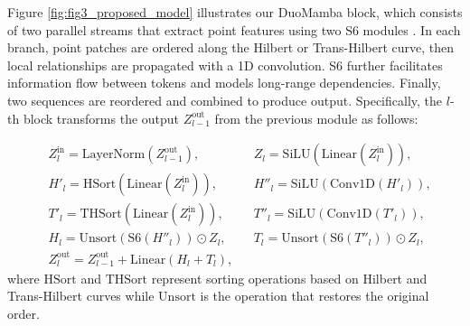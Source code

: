 Figure \ref{fig:fig3_proposed_model} illustrates our DuoMamba block, which consists of two parallel streams that extract point features using two S6 modules \cite{mamba}. In each branch, point patches are ordered along the Hilbert or Trans-Hilbert curve, then local relationships are propagated with a 1D convolution. S6 further facilitates information flow between tokens and models long-range dependencies. Finally, two sequences are reordered and combined to produce output. Specifically, the $l$-th block transforms the output $Z_{l-1}^{\text{out}}$ from the previous module as follows:

\vspace{-3mm}
{\footnotesize
\begin{equation}
\begin{aligned}
    & Z_l^{\text{in}} = \mathrm{LayerNorm} \left( Z_{l-1}^{\text{out}} \right), 
    & &Z_l = \mathrm{SiLU} \left( \mathrm{Linear} \left( Z_l^{\text{in}} \right) \right),\\
    & H'_l = \mathrm{HSort} \left( \mathrm{Linear} \left( Z_l^{\text{in}} \right) \right),     
    & &H''_l = \mathrm{SiLU} \left( \mathrm{Conv1D} \left( H'_l \right) \right),\\
    & T'_l = \mathrm{THSort} \left( \mathrm{Linear} \left( Z_l^{\text{in}} \right) \right),
    & &T''_l = \mathrm{SiLU} \left( \mathrm{Conv1D} \left( T'_l \right) \right),\\
    & H_l = \mathrm{Unsort} \left( \mathrm{S6} \left( H''_l \right) \right) \odot Z_l, 
    & &T_l = \mathrm{Unsort} \left( \mathrm{S6} \left( T''_l \right) \right) \odot Z_l,\\
    & Z_l^{\text{out}} = Z_{l-1}^{\text{out}} + \mathrm{Linear} \left( H_l + T_l \right),
\end{aligned}    
\end{equation}
}where $\mathrm{HSort}$ and $\mathrm{THSort}$ represent sorting operations based on Hilbert and Trans-Hilbert curves while $\mathrm{Unsort}$ is the operation that restores the original order.